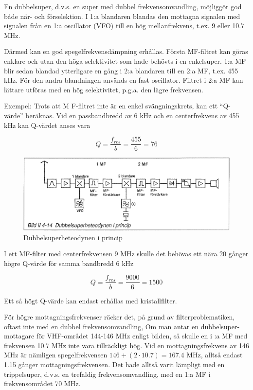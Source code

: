 En dubbelsuper, d.v.s. en super med dubbel frekvensomvandling,
möjliggör god både när- och förselektion. I 1:a blandaren blandas den
mottagna signalen med signalen från en 1:a oscillator (VFO) till en
hög mellanfrekvens, t.ex. 9 eller 10.7 MHz.

Därmed kan en god spegelfrekvensdämpning erhållas. Första MF-filtret
kan göras enklare och utan den höga selektivitet som hade behövts i en
enkelsuper. 1:a MF blir sedan blandad ytterligare en gång i 2:a
blandaren till en 2:a MF, t.ex. 455 kHz. För den andra blandningen
används en fast oscillator. Filtret i 2:a MF kan lättare utföras med
en hög selektivitet, p.g.a. den lägre frekvensen.

Exempel: Trots att M F-filtret inte är en enkel svängningskrets, kan
ett ``Q-värde'' beräknas. Vid en passbandbredd av 6 kHz och en
centerfrekvens av 455 kHz kan Q-värdet anses vara

\[ Q = \frac{f_{res}}{b} = \frac{455}{6} = 76 \]

\begin{figure}
  \includegraphics[width=\textwidth]{images/bild_2_4-14}
  \caption{Dubbelsuperheteodynen i princip}
  \label{fig:bildII4-14}
\end{figure}

I ett MF-filter med centerfrekvensen 9
MHz skulle det behövas ett nära 20 gånger
högre Q-värde för samma bandbredd 6 kHz

\[ Q = \frac{f_{res}}{b} = \frac{9000}{6} = 1500 \]

Ett så högt Q-värde kan endast erhållas med kristallfilter.

För högre mottagningsfrekvenser räcker det, på grund av
filterproblematiken, oftast inte med en dubbel frekvensomvandling, Om
man antar en dubbelsuper-mottagare för VHF-området 144-146 MHz enligt
bilden, så skulle en i :a MF med frekvensen 10.7 MHz inte vara
tillräckligt hög. Vid en mottagningsfrekvens av 146 MHz är nämligen
spegelfrekvensen \(146 + (2 \cdot 10.7) = 167.4\) MHz, alltså endast
1.15 gånger mottagningsfrekvensen. Det hade alltså varit lämpligt med
en trippelsuper, d.v.s. en trefaldig frekvensomvandling, med en 1:a
MF i frekvensområdet 70 MHz.
